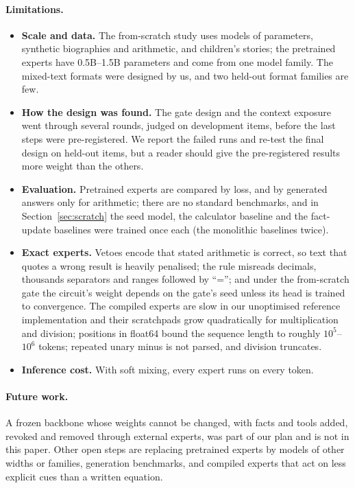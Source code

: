 \documentclass[10pt]{article}
\begin{document}
\paragraph{Limitations.}
\begin{itemize}
\item \textbf{Scale and data.} The from-scratch study uses models of \resTrackCParamsS{}
parameters, synthetic biographies and arithmetic, and children's stories; the pretrained
experts have 0.5B--1.5B parameters and come from one model family. The mixed-text formats were
designed by us, and two held-out format families are few.
\item \textbf{How the design was found.} The gate design and the context exposure went through
several rounds, judged on development items, before the last steps were pre-registered. We
report the failed runs and re-test the final design on held-out items, but a reader should give
the pre-registered results more weight than the others.
\item \textbf{Evaluation.} Pretrained experts are compared by loss, and by generated answers
only for arithmetic; there are no standard benchmarks, and in Section~\ref{sec:scratch} the seed model, the calculator baseline and the fact-update
baselines were trained once each (the monolithic baselines twice).
\item \textbf{Exact experts.} Vetoes encode that stated arithmetic is correct, so text that
quotes a wrong result is heavily penalised; the rule misreads decimals, thousands separators
and ranges followed by ``=''; and under the from-scratch gate the circuit's weight depends on
the gate's seed unless its head is trained to convergence. The compiled experts are slow in our unoptimised
reference implementation and their scratchpads grow quadratically for multiplication and
division; positions in float64 bound the sequence length to roughly $10^5$--$10^6$ tokens;
repeated unary minus is not parsed, and division truncates.
\item \textbf{Inference cost.} With soft mixing, every expert runs on every token.
\end{itemize}

\paragraph{Future work.} A frozen backbone whose weights cannot be changed, with facts and tools
added, revoked and removed through external experts, was part of our plan and is not in this
paper. Other open steps are replacing pretrained experts by models of other widths or
families, generation benchmarks,
and compiled experts that act on less explicit cues than a written equation.
\end{document}
